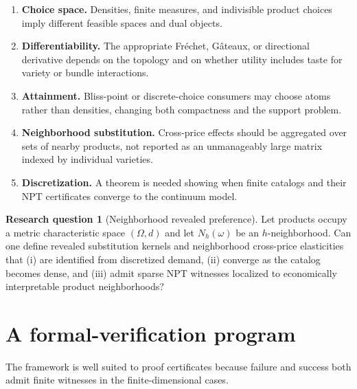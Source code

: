 \documentclass[11pt]{article}
\theoremstyle{definition}
\newtheorem{agenda}[theorem]{Research question}
\theoremstyle{remark}
\begin{document}
\begin{enumerate}[label=\textbf{C\arabic*.}]
  \item \textbf{Choice space.}  Densities, finite measures, and indivisible product choices imply
  different feasible spaces and dual objects.
  \item \textbf{Differentiability.}  The appropriate Fr\'echet, G\^ateaux, or directional derivative
  depends on the topology and on whether utility includes taste for variety or bundle interactions.
  \item \textbf{Attainment.}  Bliss-point or discrete-choice consumers may choose atoms rather than
  densities, changing both compactness and the support problem.
  \item \textbf{Neighborhood substitution.}  Cross-price effects should be aggregated over sets of
  nearby products, not reported as an unmanageably large matrix indexed by individual varieties.
  \item \textbf{Discretization.}  A theorem is needed showing when finite catalogs and their NPT
  certificates converge to the continuum model.
\end{enumerate}

\begin{agenda}[Neighborhood revealed preference]
Let products occupy a metric characteristic space $(\Omega,d)$ and let $N_h(\omega)$ be an
$h$-neighborhood.  Can one define revealed substitution kernels and neighborhood cross-price
elasticities that (i) are identified from discretized demand, (ii) converge as the catalog becomes
dense, and (iii) admit sparse NPT witnesses localized to economically interpretable product
neighborhoods?
\end{agenda}

\section{A formal-verification program}

The framework is well suited to proof certificates because failure and success both admit finite
witnesses in the finite-dimensional cases.
\end{document}

